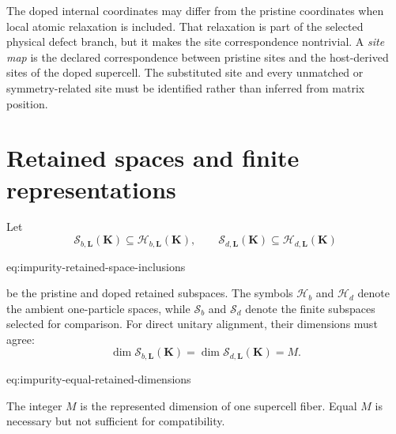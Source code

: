 The doped internal coordinates may differ from the pristine coordinates when
local atomic relaxation is included. That relaxation is part of the selected
physical defect branch, but it makes the site correspondence nontrivial. A
\emph{site map} is the declared correspondence between pristine sites and the
host-derived sites of the doped supercell. The substituted site and every
unmatched or symmetry-related site must be identified rather than inferred
from matrix position.

\section{Retained spaces and finite representations}

Let
\begin{equation}
    \mathcal S_{b,\mathbf L}(\mathbf K)
    \subseteq \mathcal H_{b,\mathbf L}(\mathbf K),
    \qquad
    \mathcal S_{d,\mathbf L}(\mathbf K)
    \subseteq \mathcal H_{d,\mathbf L}(\mathbf K)
    \label{eq:impurity-retained-space-inclusions}
\end{equation}
\begin{equationterms}{eq:impurity-retained-space-inclusions}
\end{equationterms}
be the pristine and doped retained subspaces. The symbols $\mathcal H_b$ and
$\mathcal H_d$ denote the ambient one-particle spaces, while $\mathcal S_b$ and
$\mathcal S_d$ denote the finite subspaces selected for comparison. For direct
unitary alignment, their dimensions must agree:
\begin{equation}
    \dim\mathcal S_{b,\mathbf L}(\mathbf K)
    =
    \dim\mathcal S_{d,\mathbf L}(\mathbf K)
    =M.
    \label{eq:impurity-equal-retained-dimensions}
\end{equation}
\begin{equationterms}{eq:impurity-equal-retained-dimensions}
\end{equationterms}
The integer $M$ is the represented dimension of one supercell fiber. Equal $M$
is necessary but not sufficient for compatibility.


